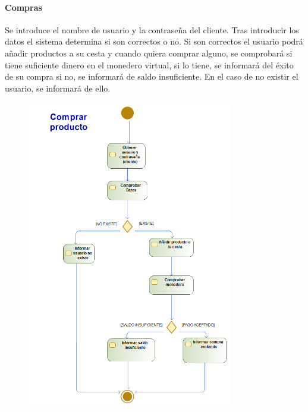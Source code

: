 \paragraph{Compras}
Se introduce el nombre de usuario y la contraseña del cliente. Tras introducir los datos el sistema determina si son correctos o no. Si son correctos el usuario podrá añadir productos a su cesta y cuando quiera comprar alguno, se comprobará si tiene suficiente dinero en el monedero virtual, si lo tiene, se informará del éxito de su compra si no, se informará de saldo insuficiente. En el caso de no existir el usuario, se informará de ello.
\begin{figure}[H]
    \centering
    \includegraphics[width=0.8\textwidth]{Use_Cases/comprar_producto.png}
\end{figure}
\newpage
